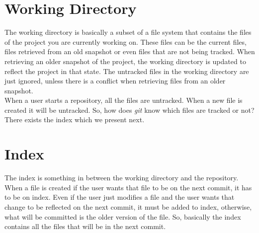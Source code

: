 \section{Working Directory}

The working directory is basically a subset of
a file system that contains the files of the project you are
currently working on. These files can be the current files, files
retrieved from an old snapshot or even files that are not being
tracked. When retrieving an older snapshot of the project, the
working directory is updated to reflect the project in that state. The
untracked files in the working directory are just ignored, unless
there is a conflict when retrieving files from an older snapshot.\\

When a user starts a repository, all the files are untracked. When a
new file is created it will be untracked. So, how does \emph{git} know which
files are tracked or not? There exists the index which we present
next.

\section{Index}
The index is something in between the working directory and the
repository. When a file is created if the user wants that file to be
on the next commit, it has to be on index. Even if the user just
modifies a file and the user wants that change to be reflected on the
next commit, it must be added to index, otherwise, what will be
committed is the older version of the file. So, basically the index
contains all the files that will be in the next commit.\\

